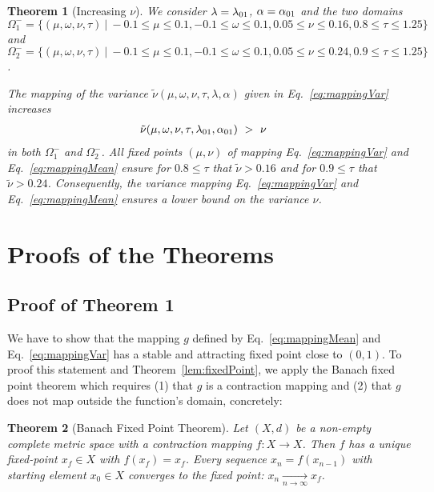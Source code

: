 \documentclass{article}
\newtheorem{theorem}{Theorem}
\newcommand\nunn{{\tilde \nu}}
\renewcommand{\leq}{\leqslant}
\begin{document}
\begin{theorem}[Increasing $\nu$]
We consider $\lambda=\lambda_{\rm 01}$, $\alpha=\alpha_{\rm 01}$
and the two domains 
$\Omega_1 ^-=\{(\mu,\omega,\nu,\tau) \ | \ -0.1 \leq \mu \leq 0.1, -0.1 \leq \omega \leq 0.1, 0.05 \leq \nu \leq 0.16, 0.8 \leq \tau \leq 1.25 \}$ 
 and
$\Omega_2 ^-=\{(\mu,\omega,\nu,\tau) \ | \ -0.1 \leq \mu \leq 0.1, -0.1 \leq \omega \leq 0.1, 0.05 \leq \nu \leq 0.24, 0.9 \leq \tau \leq 1.25 \}$. 

The mapping of the variance
$\nunn(\mu,\omega,\nu,\tau,\lambda,\alpha )$  given in Eq.~\eqref{eq:mappingVar} increases
\begin{align}
\nunn(\mu,\omega,\nu,\tau,\lambda_{\rm 01},\alpha_{\rm 01}) \ &> \ \nu 
\end{align}
in both $\Omega_1^-$ and $\Omega_2^-$.
All fixed
points $(\mu,\nu)$ of mapping Eq.~\eqref{eq:mappingVar} and
Eq.~\eqref{eq:mappingMean} ensure for $0.8 \leq \tau$ that
$\nunn>0.16$ 
and for $0.9 \leq \tau$ that $\nunn>0.24$.
Consequently, the variance mapping Eq.~\eqref{eq:mappingVar} and
Eq.~\eqref{eq:mappingMean} ensures a lower bound on the variance $\nu$. 
\end{theorem}



\section{Proofs of the Theorems}
\label{sec:proofs}

\subsection{Proof of Theorem 1} 

We have to show that the mapping $g$ defined by Eq.~\eqref{eq:mappingMean}
and Eq.~\eqref{eq:mappingVar} 
has a stable and attracting fixed point close to $(0,1)$.
To proof this statement and Theorem~\ref{lem:fixedPoint}, 
we apply the Banach fixed point theorem which 
requires (1) that $g$ is a contraction mapping and (2) 
that $g$ does not map outside the function's 
domain, concretely: 

\begin{theorem}[Banach Fixed Point Theorem]
\label{lem:Banach} 
Let $(X, d)$ be a non-empty complete metric space with a 
contraction mapping $f: X \to X$. Then $f$ has 
a unique fixed-point $x_f \in X$ with $f(x_f) = x_f$. 
Every sequence $x_n = f(x_{n-1})$
with starting element $x_0 \in X$ converges to the fixed point:
$x_n \xrightarrow[n \to \infty] \ x_f$.
\end{theorem}
\end{document}
